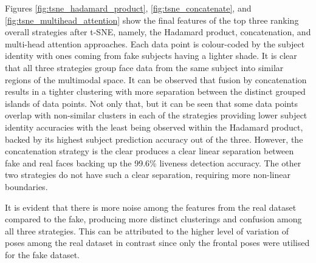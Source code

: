 \documentclass{mpaper}
\begin{document}
Figures \ref{fig:tsne_hadamard_product}, \ref{fig:tsne_concatenate}, and \ref{fig:tsne_multihead_attention} show the final features of the top three ranking overall strategies after t-SNE, namely, the Hadamard product, concatenation, and multi-head attention approaches. Each data point is colour-coded by the subject identity with ones coming from fake subjects having a lighter shade. It is clear that all three strategies group face data from the same subject into similar regions of the multimodal space. It can be observed that fusion by concatenation results in a tighter clustering with more separation between the distinct grouped islands of data points. Not only that, but it can be seen that some data points overlap with non-similar clusters in each of the strategies providing lower subject identity accuracies with the least being observed within the Hadamard product, backed by its highest subject prediction accuracy out of the three. However, the concatenation strategy is the clear produces a clear linear separation between fake and real faces backing up the 99.6\% liveness detection accuracy. The other two strategies do not have such a clear separation, requiring more non-linear boundaries.

It is evident that there is more noise among the features from the real dataset compared to the fake, producing more distinct clusterings and confusion among all three strategies. This can be attributed to the higher level of variation of poses among the real dataset in contrast since only the frontal poses were utilised for the fake dataset. 
\end{document}
